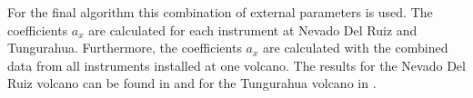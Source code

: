 \documentclass  [
  paper    = a4,
  BCOR     = 10mm,
  twoside,
  fontsize = 12pt,
  fleqn,
  toc      = bibnumbered,
  toc      = listofnumbered,
  numbers  = noendperiod,
  headings = normal,
  listof   = leveldown,
  version  = 3.03
]                                       {scrreprt}
\begin{document}
	For the final algorithm this combination of external parameters is used.
	The coefficients $a_{x}$ are calculated for each instrument at Nevado Del Ruiz and Tungurahua. Furthermore, the coefficients $a_{x}$ are calculated with the combined data from all instruments installed at one volcano. The results for the Nevado Del Ruiz volcano can be found in  and for the Tungurahua volcano in .

	
	\begin{table}
\end{table}
\end{document}
